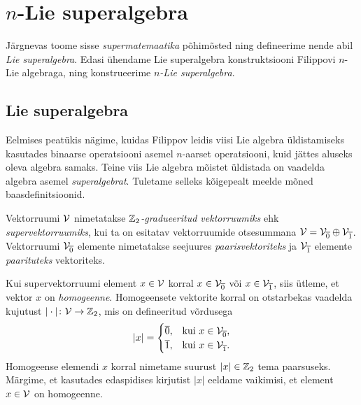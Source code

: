 

\section{\texorpdfstring{$n$}\ -Lie superalgebra}

Järgnevas toome sisse \emph{supermatemaatika} põhimõsted ning defineerime
nende abil \emph{Lie superalgebra}. Edasi ühendame Lie superalgebra
konstruktsiooni Filippovi $n$-Lie algebraga, ning konstrueerime
\emph{$n$-Lie superalgebra}.

\subsection{Lie superalgebra}

Eelmises peatükis nägime, kuidas Filippov leidis viisi Lie algebra
üldistamiseks kasutades binaarse operatsiooni asemel $n$-aarset
operatsiooni, kuid jättes aluseks oleva algebra samaks. Teine viis
Lie algebra mõistet üldistada on vaadelda algebra asemel \emph{superalgebrat}.
Tuletame selleks kõigepealt meelde mõned baasdefinitsioonid.

\begin{dfn}
    Vektorruumi $\mathcal{V}$ nimetatakse \emph{$\mathbb{Z}_2$-gradueeritud vektorruumiks}
    ehk \emph{supervektorruumiks}, kui ta on esitatav vektorruumide
    otsesummana $\mathcal{V} = \mathcal{V}_{\overline{0}} \oplus \mathcal{V}_{\overline{1}}$.
    Vektorruumi $\mathcal{V}_{\overline{0}}$ elemente nimetatakse seejuures
    \emph{paarisvektoriteks} ja $\mathcal{V}_{\overline{1}}$ elemente
    \emph{paarituteks} vektoriteks.
\end{dfn}

Kui supervektorruumi element $x \in \mathcal{V}$ korral
$x \in \mathcal{V}_{\overline{0}}$ või $x \in \mathcal{V}_{\overline{1}}$, siis ütleme, et
vektor $x$ on \emph{homogeenne}. Homogeensete vektorite korral on
otstarbekas vaadelda kujutust $|\cdot| \colon \mathcal{V} \to \mathbb{Z}_2$, mis on defineeritud
võrdusega
\begin{align*}
    |x| = \begin{cases}
        \overline{0}, &\text{kui}\ x \in \mathcal{V}_{\overline{0}}, \\
        \overline{1}, &\text{kui}\ x \in \mathcal{V}_{\overline{1}}.
    \end{cases}
\end{align*}
Homogeense elemendi $x$ korral nimetame suurust $|x| \in \mathbb{Z}_2$ tema
paarsuseks. Märgime, et kasutades edaspidises kirjutist $|x|$ eeldame
vaikimisi, et element $x \in \mathcal{V}$ on homogeenne.

